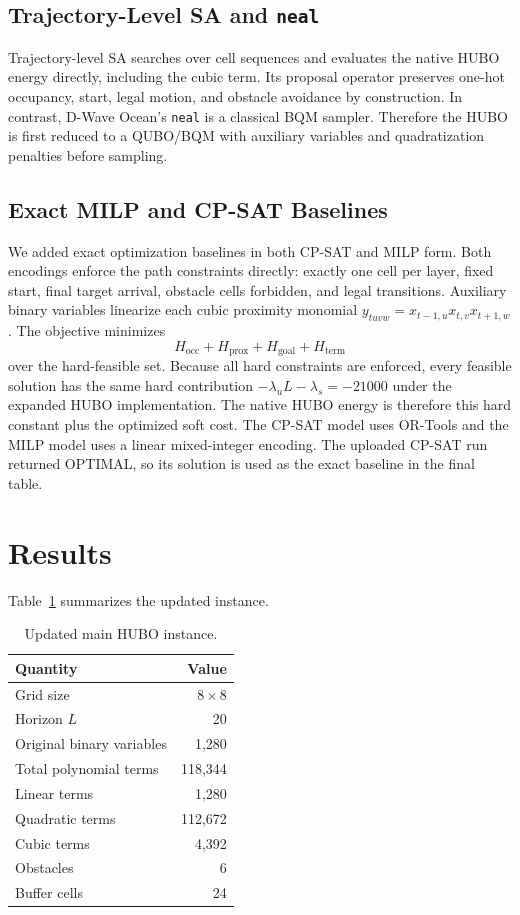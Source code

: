 \documentclass[10pt,conference]{IEEEtran}
\begin{document}
\subsection{Trajectory-Level SA and \texttt{neal}}
Trajectory-level SA searches over cell sequences and evaluates the native HUBO energy directly, including the cubic term. Its proposal operator preserves one-hot occupancy, start, legal motion, and obstacle avoidance by construction. In contrast, D-Wave Ocean's \texttt{neal} is a classical BQM sampler. Therefore the HUBO is first reduced to a QUBO/BQM with auxiliary variables and quadratization penalties before sampling.

\subsection{Exact MILP and CP-SAT Baselines}
We added exact optimization baselines in both CP-SAT and MILP form. Both encodings enforce the path constraints directly: exactly one cell per layer, fixed start, final target arrival, obstacle cells forbidden, and legal transitions. Auxiliary binary variables linearize each cubic proximity monomial $y_{tuvw}=x_{t-1,u}x_{t,v}x_{t+1,w}$. The objective minimizes
\begin{equation}
H_{\mathrm{occ}}+H_{\mathrm{prox}}+H_{\mathrm{goal}}+H_{\mathrm{term}}
\end{equation}
over the hard-feasible set. Because all hard constraints are enforced, every feasible solution has the same hard contribution $-\lambda_u L-\lambda_s=-21000$ under the expanded HUBO implementation. The native HUBO energy is therefore this hard constant plus the optimized soft cost. The CP-SAT model uses OR-Tools and the MILP model uses a linear mixed-integer encoding. The uploaded CP-SAT run returned OPTIMAL, so its solution is used as the exact baseline in the final table.

\section{Results}
Table~\ref{tab:instance} summarizes the updated instance.
\begin{table}[t]
\caption{Updated main HUBO instance.}
\label{tab:instance}
\centering
\begin{tabular}{lr}
\toprule
Quantity & Value\\
\midrule
Grid size & $8\times 8$\\
Horizon $L$ & 20\\
Original binary variables & 1,280\\
Total polynomial terms & 118,344\\
Linear terms & 1,280\\
Quadratic terms & 112,672\\
Cubic terms & 4,392\\
Obstacles & 6\\
Buffer cells & 24\\
\bottomrule
\end{tabular}
\end{table}
\end{document}
